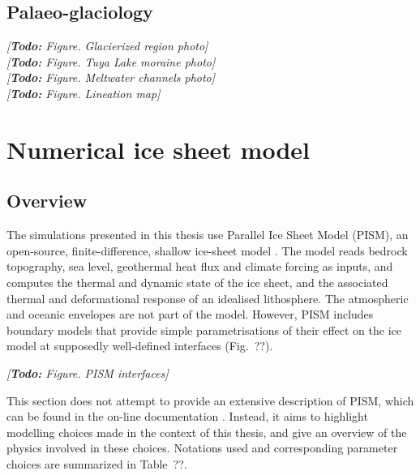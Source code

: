 \documentclass{article}
\newcommand{\todo}[1]{\emph{[\textbf{Todo:} #1]}}
\begin{document}
\subsection{Palaeo-glaciology}

\todo{Figure. Glacierized region photo}\\
\todo{Figure. Tuya Lake moraine photo}\\
\todo{Figure. Meltwater channels photo}\\
\todo{Figure. Lineation map}

\section{Numerical ice sheet model}

\subsection{Overview}

The simulations presented in this thesis use Parallel Ice Sheet Model (PISM),
an open-source, finite-difference, shallow ice-sheet model
\citep{PISM-authors.2014}. The model reads bedrock topography, sea level,
geothermal heat flux and climate forcing as inputs, and computes the thermal
and dynamic state of the ice sheet, and the associated thermal and
deformational response of an idealised lithosphere. The atmospheric and oceanic
envelopes are not part of the model. However, PISM includes boundary models
that provide simple parametrisations of their effect on the ice model at
supposedly well-defined interfaces (Fig.~??).

\todo{Figure. PISM interfaces}

This section does not attempt to provide an extensive description of PISM,
which can be found in the on-line documentation \citep{PISM-authors.2014}.
Instead, it aims to highlight modelling choices made in the context of this
thesis, and give an overview of the physics involved in these choices.
Notations used and corresponding parameter choices are summarized in Table~??.
\end{document}

